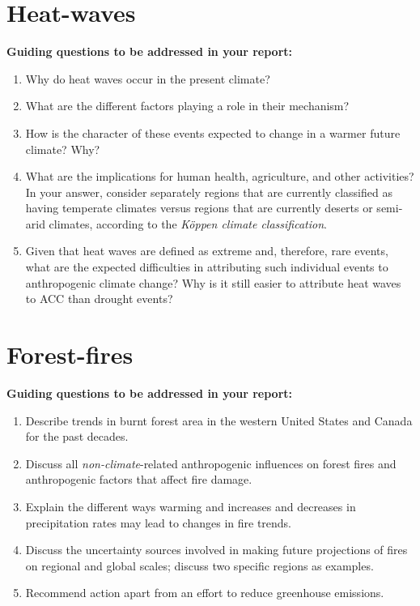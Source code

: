 \documentclass[12pt]{article}
\begin{document}
\section*{Heat-waves}
  \textbf{Guiding questions to be addressed in your report:}
    \begin{enumerate}
    \item Why do heat waves occur in the present climate?
    \item What are the different factors playing a role in their mechanism?
    \item How is the character of these events expected to change in a warmer future climate? Why?
    \item What are the implications for human health, agriculture, and other activities? In your answer, consider separately regions that are currently classified as having temperate climates versus regions that are currently deserts or semi-arid climates, according to the {\textit{K\"oppen climate classification}}.
    \item Given that heat waves are defined as extreme and, therefore, rare events, what are the expected difficulties in attributing such individual events to anthropogenic climate change? Why is it still easier to attribute heat waves to ACC than drought events?
    \end{enumerate}

\section*{Forest-fires}
  \textbf{Guiding questions to be addressed in your report:}
    \begin{enumerate}
    \item Describe trends in burnt forest area in the western United States and Canada for the past decades.
    \item Discuss all {\textit{non-climate}}-related anthropogenic influences on forest fires and anthropogenic factors that affect fire damage.
    \item Explain the different ways warming and increases and decreases in precipitation rates may lead to changes in fire trends.
    \item Discuss the uncertainty sources involved in making future projections of fires on regional and global scales; discuss two specific regions as examples.
    \item Recommend action apart from an effort to reduce greenhouse emissions.
    \end{enumerate}
\end{document}
